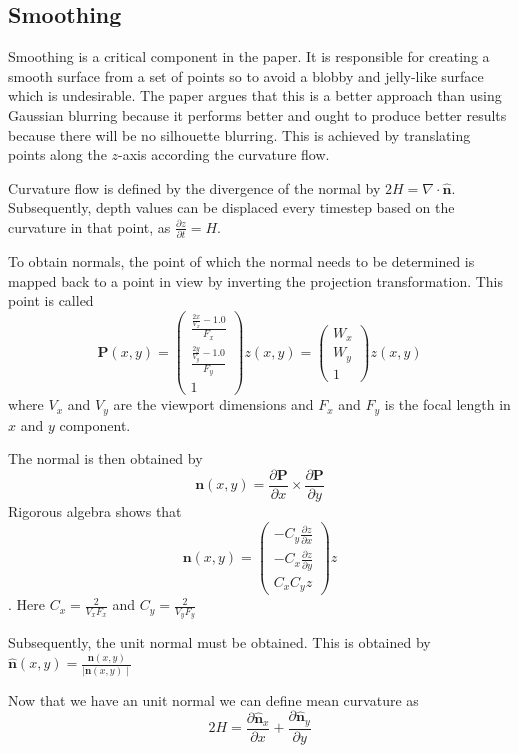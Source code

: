 \subsection{Smoothing}
Smoothing is a critical component in the paper. It is responsible for creating a smooth surface from a set of points so to avoid a blobby and jelly-like surface which is undesirable. The paper argues that this is a better approach than using Gaussian blurring because it performs better and ought to produce better results because there will be no silhouette blurring. 
This is achieved by translating points along the $z$-axis according the curvature flow. 

Curvature flow is defined by the divergence of the normal by \(2H = \nabla \cdot \hat{\mathbf{n}}\). Subsequently, depth values can be displaced every timestep based on the curvature in that point, as \(\frac{\partial z}{\partial t} = H\).

To obtain normals, the point of which the normal needs to be determined is mapped back to a point in view by inverting the projection transformation. This point is called \[\mathbf{P}(x, y) = \begin{pmatrix}\frac{\frac{2x}{V_x} - 1.0}{F_x}\\\frac{\frac{2y}{V_y} - 1.0}{F_y}\\1\end{pmatrix}z(x,y) = \begin{pmatrix}W_x\\W_y\\1\end{pmatrix}z(x,y)\] where \(V_x\) and \(V_y\) are the viewport dimensions and \(F_x\) and \(F_y\) is the focal length in \(x\) and \(y\) component.

The normal is then obtained by \[\mathbf{n}(x,y) = \frac{\partial \mathbf{P}}{\partial x} \times \frac{\partial \mathbf{P}}{\partial y}\]
Rigorous algebra shows that \[\mathbf{n}(x,y) = \begin{pmatrix}-C_y\frac{\partial z}{\partial x}\\-C_x\frac{\partial z}{\partial y}\\C_xC_yz\end{pmatrix}z\]. Here \(C_x = \frac{2}{V_xF_x}\) and \(C_y = \frac{2}{V_yF_y}\) 

Subsequently, the unit normal must be obtained. This is obtained by \(\hat{\mathbf{n}}(x,y) = \frac{\mathbf{n}(x,y)}{\mid \mathbf{n}(x,y)\mid}\)

Now that we have an unit normal we can define mean curvature as \[2H = \frac{\partial \hat{\mathbf{n}}_x}{\partial x} + \frac{\partial\hat{\mathbf{n}}_y}{\partial y}\]

